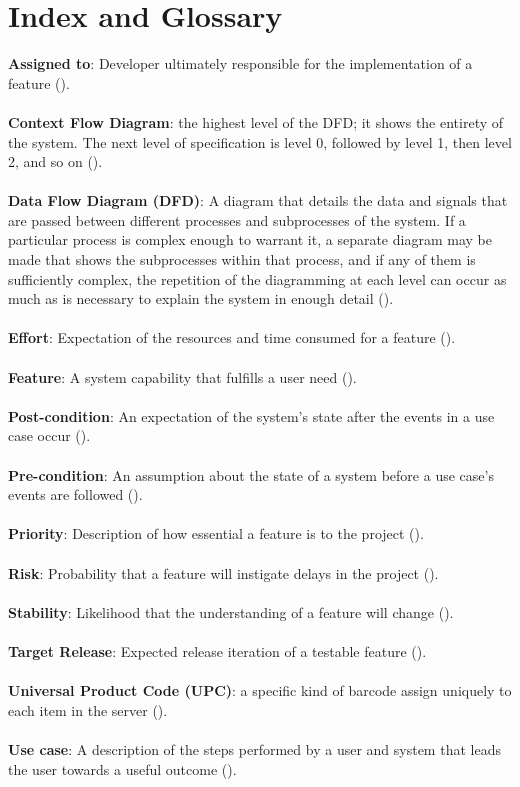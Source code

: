 \documentclass{article}
\begin{document}
\section{Index and Glossary}
\textbf{Assigned to}: Developer ultimately responsible for the implementation of a feature (\pageref{assigned_to}).\\ \\
\textbf{Context Flow Diagram}: the highest level of the DFD; it shows the entirety of the system. The next level of specification is level 0, followed by level 1, then level 2, and so on (\pageref{cfd}).\\ \\
\textbf{Data Flow Diagram (DFD)}: A diagram that details the data and signals that are passed between different processes and subprocesses of the system. If a particular process is complex enough to warrant it, a separate diagram may be made that shows the subprocesses within that process, and if any of them is sufficiently complex, the repetition of the diagramming at each level can occur as much as is necessary to explain the system in enough detail (\pageref{dfd}).\\ \\
\textbf{Effort}: Expectation of the resources and time consumed for a feature (\pageref{effort}).\\ \\
\textbf{Feature}: A system capability that fulfills a user need (\pageref{feature}).\\ \\
\textbf{Post-condition}: An expectation of the system's state after the events in a use case occur (\pageref{post_cond}).\\ \\
\textbf{Pre-condition}: An assumption about the state of a system before a use case's events are followed (\pageref{pre_cond}).\\ \\
\textbf{Priority}: Description of how essential a feature is to the project (\pageref{priority}).\\ \\
\textbf{Risk}: Probability that a feature will instigate delays in the project (\pageref{risk}).\\ \\
\textbf{Stability}: Likelihood that the understanding of a feature will change (\pageref{stability}).\\ \\
\textbf{Target Release}: Expected release iteration of a testable feature (\pageref{target_release}).\\ \\
\textbf{Universal Product Code (UPC)}: a specific kind of barcode assign uniquely to each item in the server (\pageref{upc}).\\ \\
\textbf{Use case}: A description of the steps performed by a user and system that leads the user towards a useful outcome (\pageref{use_case}).
\end{document}
